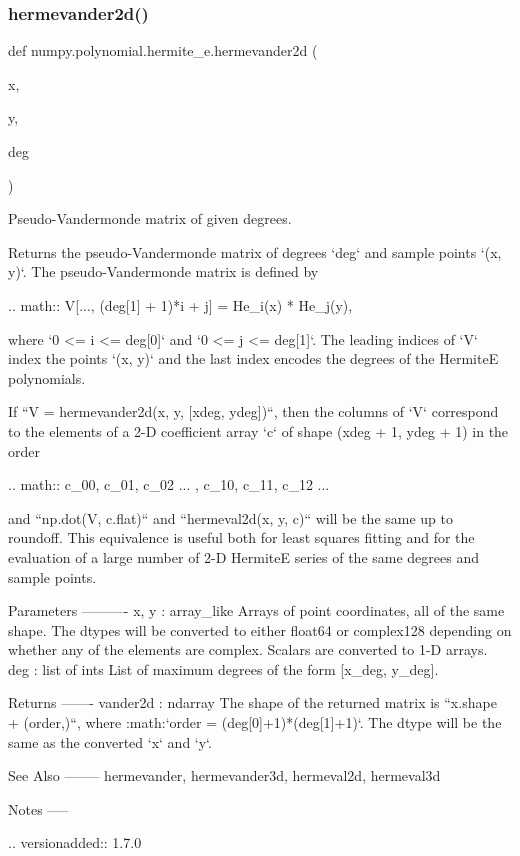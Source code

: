 \subsubsection{\texorpdfstring{hermevander2d()}{hermevander2d()}}
{\footnotesize\ttfamily def numpy.\+polynomial.\+hermite\+\_\+e.\+hermevander2d (\begin{DoxyParamCaption}\item[{}]{x,  }\item[{}]{y,  }\item[{}]{deg }\end{DoxyParamCaption})}

\begin{DoxyVerb}Pseudo-Vandermonde matrix of given degrees.

Returns the pseudo-Vandermonde matrix of degrees `deg` and sample
points `(x, y)`. The pseudo-Vandermonde matrix is defined by

.. math:: V[..., (deg[1] + 1)*i + j] = He_i(x) * He_j(y),

where `0 <= i <= deg[0]` and `0 <= j <= deg[1]`. The leading indices of
`V` index the points `(x, y)` and the last index encodes the degrees of
the HermiteE polynomials.

If ``V = hermevander2d(x, y, [xdeg, ydeg])``, then the columns of `V`
correspond to the elements of a 2-D coefficient array `c` of shape
(xdeg + 1, ydeg + 1) in the order

.. math:: c_{00}, c_{01}, c_{02} ... , c_{10}, c_{11}, c_{12} ...

and ``np.dot(V, c.flat)`` and ``hermeval2d(x, y, c)`` will be the same
up to roundoff. This equivalence is useful both for least squares
fitting and for the evaluation of a large number of 2-D HermiteE
series of the same degrees and sample points.

Parameters
----------
x, y : array_like
    Arrays of point coordinates, all of the same shape. The dtypes
    will be converted to either float64 or complex128 depending on
    whether any of the elements are complex. Scalars are converted to
    1-D arrays.
deg : list of ints
    List of maximum degrees of the form [x_deg, y_deg].

Returns
-------
vander2d : ndarray
    The shape of the returned matrix is ``x.shape + (order,)``, where
    :math:`order = (deg[0]+1)*(deg[1]+1)`.  The dtype will be the same
    as the converted `x` and `y`.

See Also
--------
hermevander, hermevander3d, hermeval2d, hermeval3d

Notes
-----

.. versionadded:: 1.7.0\end{DoxyVerb}
 \mbox{\label{namespacenumpy_1_1polynomial_1_1hermite__e_a9319ebd8c816790ac8682a3861dc0e6a}} 
